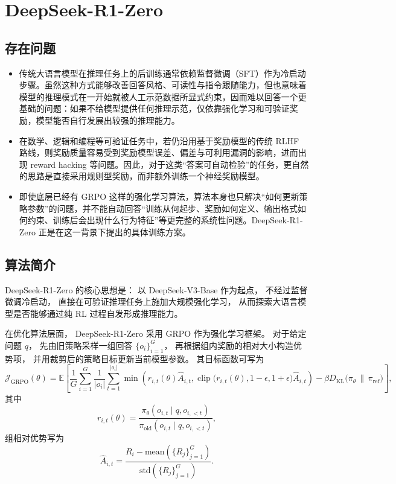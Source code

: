 \documentclass[UTF8]{ctexart}
\begin{document}
\section{DeepSeek-R1-Zero}

\subsection{存在问题}

\begin{itemize}
    \item 传统大语言模型在推理任务上的后训练通常依赖监督微调（SFT）作为冷启动步骤。虽然这种方式能够改善回答风格、可读性与指令跟随能力，但也意味着模型的推理模式在一开始就被人工示范数据所显式约束，因而难以回答一个更基础的问题：如果不给模型提供任何推理示范，仅依靠强化学习和可验证奖励，模型能否自行发展出较强的推理能力。
    \item 在数学、逻辑和编程等可验证任务中，若仍沿用基于奖励模型的传统 RLHF 路线，则奖励质量容易受到奖励模型误差、偏差与可利用漏洞的影响，进而出现 reward hacking 等问题。因此，对于这类“答案可自动检验”的任务，更自然的思路是直接采用规则型奖励，而非额外训练一个神经奖励模型。
    \item 即使底层已经有 GRPO 这样的强化学习算法，算法本身也只解决“如何更新策略参数”的问题，并不能自动回答“训练从何起步、奖励如何定义、输出格式如何约束、训练后会出现什么行为特征”等更完整的系统性问题。DeepSeek-R1-Zero 正是在这一背景下提出的具体训练方案。
\end{itemize}

\subsection{算法简介}

DeepSeek-R1-Zero 的核心思想是：
以 DeepSeek-V3-Base 作为起点，
不经过监督微调冷启动，
直接在可验证推理任务上施加大规模强化学习，
从而探索大语言模型是否能够通过纯 RL 过程自发形成推理能力。

在优化算法层面，
DeepSeek-R1-Zero 采用 GRPO 作为强化学习框架。
对于给定问题 $q$，
先由旧策略采样一组回答 $\{o_i\}_{i=1}^{G}$，
再根据组内奖励的相对大小构造优势项，
并用裁剪后的策略目标更新当前模型参数。
其目标函数可写为
\begin{equation}
\mathcal{J}_{\mathrm{GRPO}}(\theta)
=
\mathbb{E}
\left[
\frac{1}{G}
\sum_{i=1}^{G}
\frac{1}{|o_i|}
\sum_{t=1}^{|o_i|}
\min\!\left(
r_{i,t}(\theta)\hat{A}_{i,t},
\operatorname{clip}\!\bigl(r_{i,t}(\theta),1-\epsilon,1+\epsilon\bigr)\hat{A}_{i,t}
\right)
-
\beta D_{\mathrm{KL}}\!\bigl(\pi_\theta \,\|\, \pi_{\mathrm{ref}}\bigr)
\right],
\end{equation}
其中
\begin{equation}
r_{i,t}(\theta)
=
\frac{\pi_\theta(o_{i,t}\mid q,o_{i,<t})}
{\pi_{\mathrm{old}}(o_{i,t}\mid q,o_{i,<t})},
\end{equation}
组相对优势写为
\begin{equation}
\hat{A}_{i,t}
=
\frac{R_i-\mathrm{mean}(\{R_j\}_{j=1}^{G})}
{\mathrm{std}(\{R_j\}_{j=1}^{G})}.
\end{equation}
\end{document}
